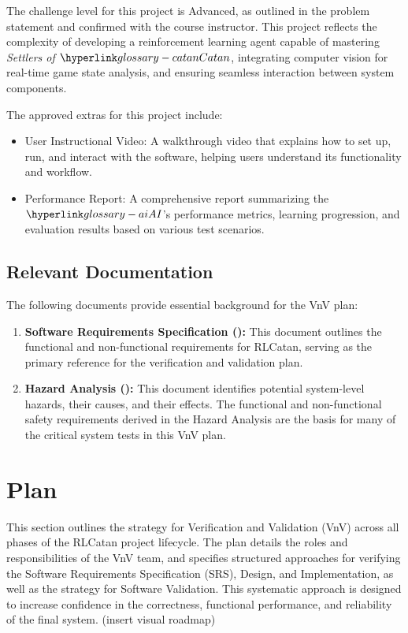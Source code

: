 \documentclass[12pt, titlepage]{article}
\begin{document}
The challenge level for this project is Advanced,
 as outlined in the problem statement and confirmed 
 with the course instructor. This project
  reflects the complexity of developing a 
  reinforcement learning agent capable of
   mastering \textit{Settlers of $\Catan{}$},
    integrating computer vision for real-time game state 
    analysis, and ensuring seamless interaction between
     system components.

\medskip
The approved extras for this project include:
\begin{itemize}
    \item User Instructional Video: A walkthrough video that explains how to set up, run, and interact with the software, helping users understand its functionality and workflow.
    \item Performance Report: A comprehensive report summarizing the $\AI{}$'s performance metrics, learning progression, and evaluation results based on various test scenarios.
\end{itemize}

\subsection{Relevant Documentation}

The following documents provide essential background for the VnV plan:

\begin{enumerate}
  \item \textbf{Software Requirements Specification (\citet{SRS}):} This document outlines the functional and non-functional requirements for RLCatan, serving as the primary reference for the verification and validation plan.
  \item \textbf{Hazard Analysis (\citet{HA}):} This document identifies potential system-level hazards, their causes, and their effects.
  The functional and non-functional safety requirements derived in the Hazard Analysis are the basis for many of the critical system tests in this VnV plan.
\end{enumerate}


\section{Plan}

This section outlines the strategy for Verification and Validation (VnV) across all phases of the RLCatan project lifecycle.
The plan details the roles and responsibilities of the VnV team, and specifies structured approaches for verifying the Software Requirements Specification (SRS), Design, and Implementation, as well as the strategy for Software Validation.
This systematic approach is designed to increase confidence in the correctness, functional performance, and reliability of the final system.
(insert visual roadmap)
\end{document}

